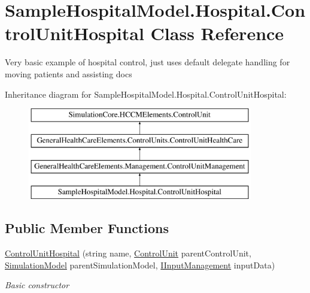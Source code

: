 \hypertarget{class_sample_hospital_model_1_1_hospital_1_1_control_unit_hospital}{}\section{Sample\+Hospital\+Model.\+Hospital.\+Control\+Unit\+Hospital Class Reference}
\label{class_sample_hospital_model_1_1_hospital_1_1_control_unit_hospital}


Very basic example of hospital control, just uses default delegate handling for moving patients and assisting docs  


Inheritance diagram for Sample\+Hospital\+Model.\+Hospital.\+Control\+Unit\+Hospital\+:\begin{figure}[H]
\begin{center}
\leavevmode
\includegraphics[height=4.000000cm]{class_sample_hospital_model_1_1_hospital_1_1_control_unit_hospital}
\end{center}
\end{figure}
\subsection*{Public Member Functions}
\begin{DoxyCompactItemize}
\item 
\hyperlink{class_sample_hospital_model_1_1_hospital_1_1_control_unit_hospital_a487e1f27449df2eccb15e88248cadc9d}{Control\+Unit\+Hospital} (string name, \hyperlink{class_simulation_core_1_1_h_c_c_m_elements_1_1_control_unit}{Control\+Unit} parent\+Control\+Unit, \hyperlink{class_simulation_core_1_1_simulation_classes_1_1_simulation_model}{Simulation\+Model} parent\+Simulation\+Model, \hyperlink{interface_general_health_care_elements_1_1_management_1_1_i_input_management}{I\+Input\+Management} input\+Data)
\begin{DoxyCompactList}\small\item\em Basic constructor \end{DoxyCompactList}\end{DoxyCompactItemize}
